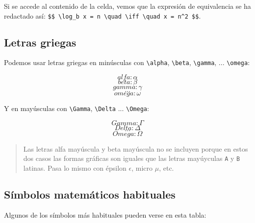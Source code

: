 \documentclass[11pt]{article}
\begin{document}
Si se accede al contenido de la celda, vemos que la expresión de
equivalencia se ha redactado así:
\texttt{\$\$\ \textbackslash{}log\_b\ x\ =\ n\ \textbackslash{}quad\ \textbackslash{}iff\ \textbackslash{}quad\ x\ =\ n\^{}2\ \$\$}.

    \subsection{Letras griegas}\label{letras-griegas}

Podemos usar letras griegas en minúsculas con
\texttt{\textbackslash{}alpha}, \texttt{\textbackslash{}beta},
\texttt{\textbackslash{}gamma}, ... \texttt{\textbackslash{}omega}:

\[ alfa: \alpha \] \[ beta: \beta \] \[ gamma: \gamma \] \[ ... \]
\[ omega: \omega \]

Y en mayúsculas con \texttt{\textbackslash{}Gamma},
\texttt{\textbackslash{}Delta} ... \texttt{\textbackslash{}Omega}:

\[ Gamma: \Gamma \] \[ Delta: \Delta \] \[ ... \] \[ Omega: \Omega \]

\begin{quote}
Las letras alfa mayúscula y beta mayúscula no se incluyen porque en
estos dos casos las formas gráficas son iguales que las letras
mayúyculas \texttt{A} y \texttt{B} latinas. Pasa lo mismo con épsilon
\(\epsilon\), micro \(\mu\), etc.
\end{quote}

    \subsection{Símbolos matemáticos
habituales}\label{suxedmbolos-matemuxe1ticos-habituales}

Algunos de los símbolos más habituales pueden verse en esta tabla:
\end{document}

